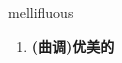
\begin{frame}
{\huge mellifluous}
\begin{center}
\begin{enumerate}\Large
  \item \textbf{(曲调)优美的}
\end{enumerate}
\end{center}
\end{frame}
